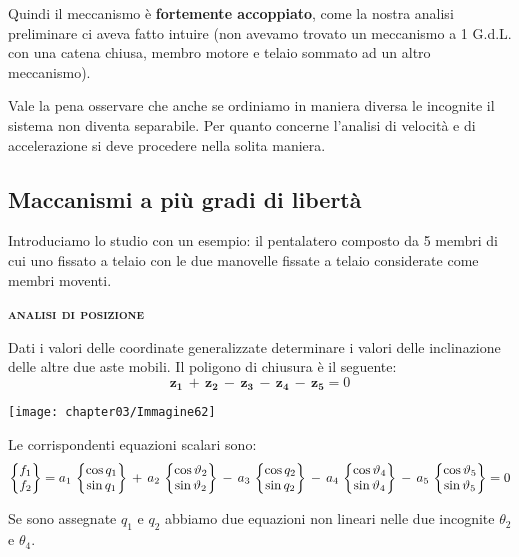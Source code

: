 		Quindi il meccanismo è \textbf{fortemente accoppiato}, come la nostra analisi preliminare ci aveva fatto intuire (non avevamo trovato un meccanismo a 1 G.d.L. con una catena chiusa, membro motore e telaio sommato ad un altro meccanismo).
		
		Vale la pena osservare che anche se ordiniamo in maniera diversa le incognite il sistema non diventa separabile. Per quanto concerne l'analisi di velocità e di accelerazione si deve procedere nella solita maniera.
		
	\subsection{Maccanismi a più gradi di libertà}
	
	
\begin{minipage}{.6\textwidth}
Introduciamo lo studio con un esempio: il pentalatero composto da 5 membri di cui uno fissato a telaio con le due manovelle fissate a telaio considerate come membri moventi.
\vspace{2mm}

\begin{center}
	{\scshape{\bfseries analisi di posizione}}
	\end{center}
		
		Dati i valori delle coordinate generalizzate determinare i valori delle inclinazione delle altre due aste mobili. Il poligono di chiusura è il seguente:
		\[
		\mathbf{z_1}\,+\,\mathbf{z_2}\,-\,\mathbf{z_3}\,-\,\mathbf{z_4}\,-\,\mathbf{z_5} = 0
		\]
		
\end{minipage}
\hfill
	\begin{minipage}{.4\textwidth}
		\centering
		\texttt{[image: chapter03/Immagine62]}
		\end{minipage}
		
	
		Le corrispondenti equazioni scalari sono:
		\[
		\begin{Bmatrix}f_1\\f_2\end{Bmatrix}= a_1\,\begin{Bmatrix}\cos{q_1}\\\sin{q_1}\end{Bmatrix}\,+\,a_2\,\begin{Bmatrix}\cos{\vartheta_2}\\\sin{\vartheta_2}\end{Bmatrix}\,-\,a_3\,\begin{Bmatrix}\cos{q_2}\\\sin{q_2}\end{Bmatrix}\,-\,a_4\,\begin{Bmatrix}\cos{\vartheta_4}\\\sin{\vartheta_4}\end{Bmatrix}\,-\,a_5\,\begin{Bmatrix}\cos{\vartheta_5}\\\sin{\vartheta_5}\end{Bmatrix}=0
		\]
		
		Se sono assegnate $q_1$ e $q_2$ abbiamo due equazioni non lineari nelle due incognite $\theta_2$ e $\theta_4$.
		
